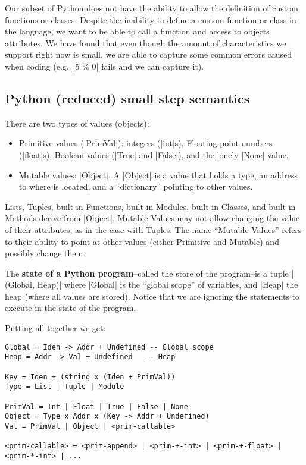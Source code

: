 Our subset of Python does not have the ability to allow the definition of custom functions
or classes. Despite the inability to define a custom function or class in the language, we
want to be able to call a function and access to objects attributes. We have found that
even though the amount of characteristics we support right now is small, we are able to
capture some common errors caused when coding (e.g.~\pycode|5 \% 0| fails and we can
capture it).

\subsection{Python (reduced) small step semantics}

There are two types of values (objects):

\begin{itemize}
\tightlist
\item
  Primitive values (\pycode|PrimVal|): integers (\pycode|int|s),
  Floating point numbers (\pycode|float|s), Boolean values
  (\pycode|True| and \pycode|False|), and the lonely \pycode|None|
  value.
\item
  Mutable values: \pycode|Object|. A \pycode|Object| is a value that
  holds a type, an address to where is located, and a
  \enquote{dictionary} pointing to other values.
\end{itemize}

Lists, Tuples, built-in Functions, built-in Modules, built-in Classes, and
built-in Methods derive from \pycode|Object|. Mutable Values may not
allow changing the value of their attributes, as in the case with
Tuples. The name \enquote{Mutable Values} refers to their ability to
point at other values (either Primitive and Mutable) and possibly change
them.

The \textbf{state of a Python program}--called the store of the program--is a tuple
\pycode|(Global, Heap)| where \pycode|Global| is the \enquote{global scope} of variables,
and \pycode|Heap| the heap (where all values are stored). Notice that we are ignoring the
statements to execute in the state of the program.

Putting all together we get:

\begin{verbatim}
Global = Iden -> Addr + Undefined -- Global scope
Heap = Addr -> Val + Undefined   -- Heap

Key = Iden + (string x (Iden + PrimVal))
Type = List | Tuple | Module

PrimVal = Int | Float | True | False | None
Object = Type x Addr x (Key -> Addr + Undefined)
Val = PrimVal | Object | <prim-callable>

<prim-callable> = <prim-append> | <prim-+-int> | <prim-+-float> | <prim-*-int> | ...
\end{verbatim}

